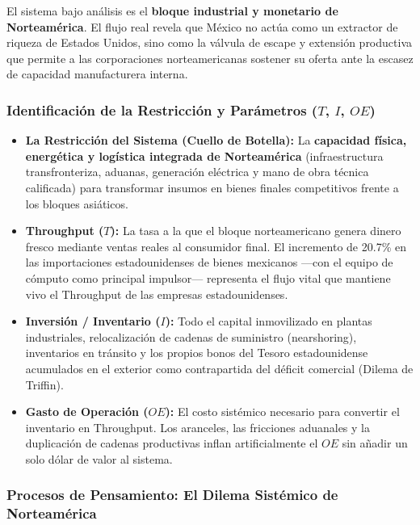 \documentclass[12pt,letterpaper]{article}
\providecommand{\tightlist}{%
  \setlength{\itemsep}{0pt}\setlength{\parskip}{0pt}}
\begin{document}
El sistema bajo análisis es el \textbf{bloque industrial y monetario de
Norteamérica}. El flujo real revela que México no actúa como un
extractor de riqueza de Estados Unidos, sino como la válvula de escape y
extensión productiva que permite a las corporaciones norteamericanas
sostener su oferta ante la escasez de capacidad manufacturera interna.

\hypertarget{identificaciuxf3n-de-la-restricciuxf3n-y-paruxe1metros-t-i-oe}{%
\subsubsection{\texorpdfstring{Identificación de la Restricción y
Parámetros (\(T\), \(I\),
\(OE\))}{Identificación de la Restricción y Parámetros (T, I, OE)}}\label{identificaciuxf3n-de-la-restricciuxf3n-y-paruxe1metros-t-i-oe}}

\begin{itemize}
\tightlist
\item
  \textbf{La Restricción del Sistema (Cuello de Botella):} La
  \textbf{capacidad física, energética y logística integrada de
  Norteamérica} (infraestructura transfronteriza, aduanas, generación
  eléctrica y mano de obra técnica calificada) para transformar insumos
  en bienes finales competitivos frente a los bloques asiáticos.
\item
  \textbf{Throughput (\(T\)):} La tasa a la que el bloque norteamericano
  genera dinero fresco mediante ventas reales al consumidor final. El
  incremento de 20.7\% en las importaciones estadounidenses de bienes
  mexicanos ---con el equipo de cómputo como principal impulsor---
  representa el flujo vital que mantiene vivo el Throughput de las
  empresas estadounidenses.
\item
  \textbf{Inversión / Inventario (\(I\)):} Todo el capital inmovilizado
  en plantas industriales, relocalización de cadenas de suministro
  (nearshoring), inventarios en tránsito y los propios bonos del Tesoro
  estadounidense acumulados en el exterior como contrapartida del
  déficit comercial (Dilema de Triffin).
\item
  \textbf{Gasto de Operación (\(OE\)):} El costo sistémico necesario
  para convertir el inventario en Throughput. Los aranceles, las
  fricciones aduanales y la duplicación de cadenas productivas inflan
  artificialmente el \(OE\) sin añadir un solo dólar de valor al
  sistema.
\end{itemize}

\hypertarget{procesos-de-pensamiento-el-dilema-sistuxe9mico-de-norteamuxe9rica}{%
\subsubsection{Procesos de Pensamiento: El Dilema Sistémico de
Norteamérica}\label{procesos-de-pensamiento-el-dilema-sistuxe9mico-de-norteamuxe9rica}}
\end{document}
